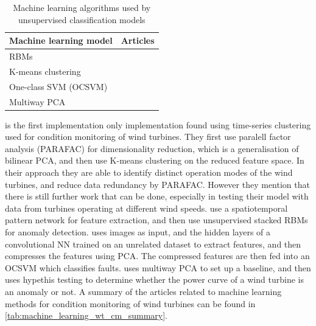 \begin{table}[h]
    \centering
    \begin{tabular}{p{}p{}}
        \toprule
        Machine learning model & Articles \\
        \midrule
        RBMs                    & \cite{unsup_graphical_modeling_wt_cm} \\
        K-means clustering      & \cite{fault_detect_PARAFAC_k_means} \\
        One-class SVM (OCSVM)   & \cite{unsupervised_AD_blade_damage_deep_features_images} \\
        Multiway PCA            & \cite{multiway_PCA_multivar_inference_cm_wt} \\
        \bottomrule
    \end{tabular}
    \caption{Machine learning algorithms used by unsupervised classification models}
    \label{tab:sup_classification_ml_models}
\end{table}

\textcite{fault_detect_PARAFAC_k_means} is the first implementation only implementation found using time-series clustering used for condition monitoring of wind turbines. They first use paralell factor analysis (PARAFAC) for dimensionality reduction, which is a generalisation of bilinear PCA, and then use K-means clustering on the reduced feature space. In their approach they are able to identify distinct operation modes of the wind turbines, and reduce data redundancy by PARAFAC. However they mention that there is still further work that can be done, especially in testing their model with data from turbines operating at different wind speeds. \textcite{unsup_graphical_modeling_wt_cm} use a spatiotemporal pattern network for feature extraction, and then use unsupervised stacked RBMs for anomaly detection. \textcite{unsupervised_AD_blade_damage_deep_features_images} uses images as input, and the hidden layers of a convolutional NN trained on an unrelated dataset to extract features, and then compresses the features using PCA. The compressed features are then fed into an OCSVM which classifies faults. \textcite{multiway_PCA_multivar_inference_cm_wt} uses multiway PCA to set up a baseline, and then uses hypethis testing to determine whether the power curve of a wind turbine is an anomaly or not. A summary of the articles related to machine learning methods for condition monitoring of wind turbines can be found in \ref{tab:machine_learning_wt_cm_summary}.

